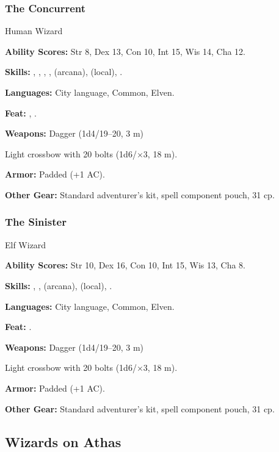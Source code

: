 \subsubsection{The Concurrent}
Human Wizard

\textbf{Ability Scores:} Str 8, Dex 13, Con 10, Int 15, Wis 14, Cha 12.

\textbf{Skills:} , , , ,  (arcana),  (local), .

\textbf{Languages:} City language, Common, Elven.

\textbf{Feat:} , .

\textbf{Weapons:} Dagger (1d4/19--20, 3 m)

Light crossbow with 20 bolts (1d6/$\times$3, 18 m).

\textbf{Armor:} Padded (+1 AC).

\textbf{Other Gear:} Standard adventurer's kit, spell component pouch, 31 cp.

\subsubsection{The Sinister}
Elf Wizard

\textbf{Ability Scores:} Str 10, Dex 16, Con 10, Int 15, Wis 13, Cha 8.

\textbf{Skills:} , ,  (arcana),  (local), .

\textbf{Languages:} City language, Common, Elven.

\textbf{Feat:} .

\textbf{Weapons:} Dagger (1d4/19--20, 3 m)

Light crossbow with 20 bolts (1d6/$\times$3, 18 m).

\textbf{Armor:} Padded (+1 AC).

\textbf{Other Gear:} Standard adventurer's kit, spell component pouch, 31 cp.

\subsection{Wizards on Athas}

